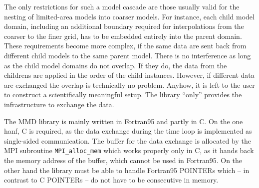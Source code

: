 \documentclass[twoside]{article}
\begin{document}
The only restrictions for such a model cascade are those usually valid for the 
nesting of limited-area models into coarser models. 
For instance, each child model domain, including an additional
boundary required for interpolations from the coarser to the finer
grid, has to be embedded entirely into the parent domain.
These requirements become more complex, if the same data are sent back
from different child models to the same parent model. 
There is no interference as long as the child model domains do not
overlap. If they do, the data from the childrens are applied in the
order of the child instances.
However, if different data are exchanged the overlap is technically no
problem.
Anyhow, it is left to the user to construct a scientifically meaningful
setup. The library ``only'' provides the infrastructure to exchange the data.

The MMD library is mainly written in Fortran95 and partly in C. On the
 one hanf, C is
 required, as the data exchange during the time loop is 
implemented as single-sided communication.
 The buffer for the data  exchange is allocated by the MPI 
subroutine \verb|MPI_alloc_mem| which works properly only in C, as it hands
 back the memory address of the buffer, which cannot be used in Fortran95.
On the other hand the library must be able to handle Fortran95 
{\footnotesize POINTER}s which  -- in contrast to C {\footnotesize POINTER}s -- 
do not have to be consecutive in memory. 
\end{document}
